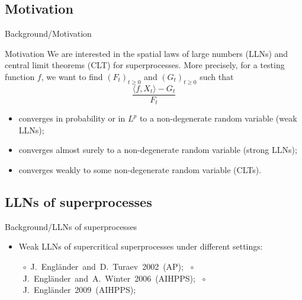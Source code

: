 \documentclass[xcolor=dvipsnames]{beamer}
\begin{document}
\subsection{Motivation}
\begin{frame}{Background/Motivation}
  \begin{block}{Motivation}
    We are interested in the spatial laws of large numbers (LLNs) and central limit theorems (CLT) for superprocesses.
    More precisely, for a testing function $f$, we want to find
    $(F_t)_{t\geq 0}$ and $(G_t)_{t\geq 0}$ such that
    \[  
      \frac{\langle f, X_t \rangle -G_t}{F_t}
    \]

    \begin{itemize}
    \item
      converges in probability or in $L^p$ to a non-degenerate random variable (weak LLNs);
    \item
      converges almost surely to a non-degenerate random variable (strong LLNs);
    \item
      converges weakly to some non-degenerate random variable (CLTs).
    \end{itemize}
  \end{block}
\end{frame}
\subsection{LLNs of superprocesses}
\begin{frame}{Background/LLNs of superprocesses}
\begin{itemize}
\item
  {\color{red}Weak LLNs of supercritical superprocesses} under different settings: 
  
  \mbox{ $\circ$ J. Engl\"{a}nder and D. Turaev 2002 (AP);}
  \mbox{ $\circ$ J. Engl\"{a}nder and A. Winter 2006 (AIHPPS);}
  \mbox{ $\circ$ J. Engl\"{a}nder 2009 (AIHPPS);} 
\end{itemize}
\let\thefootnote\relax{}
\end{frame}
\end{document}
